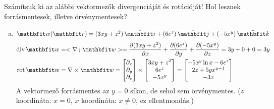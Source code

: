 \documentclass[exercise]{math-standalone}
\begin{document}
\begin{exercise}{%
    Számítsuk ki az alábbi vektormezők divergenciáját és rotációját!
    Hol lesznek forrásmentesek, illetve örvénymentesek?
  }
{\begin{enumerate}[a)]
      \item $\rvec w(\rvec r) = (3xy + z^2) \,\uvec i + (6 e^z) \,\uvec j + (-5x^y) \,\uvec k$
            \begin{align*}
              \Div \rvec w
               & = \scalar{\nabla}{\rvec w}
              = \pdv{(3xy + z^2)}{x} + \pdv{(6 e^z)}{y} + \pdv{(-5x^y)}{z}
              = 3y + 0 + 0
              = 3y
              \\
              \rot \rvec w
               & = \nabla \times \rvec w
              = \begin{bmatrix}
                  \partial_x \\ \partial_y \\ \partial_z
                \end{bmatrix} \times \begin{bmatrix}
                                       3xy + z^2 \\ 6e^z \\ -5x^y
                                     \end{bmatrix} = \begin{bmatrix}
                                                       -5 x^y \ln x - 6 e^z \\
                                                       2z + 5 y x^{y-1}     \\
                                                       -3x
                                                     \end{bmatrix}
            \end{align*}
            A vektormező forrásmentes az $y = 0$ síkon, de sehol sem
            örvénymentes. ($z$ koordináta: $x = 0$, $x$ koordináta: $x \neq 0$,
            ez ellentmondás.)
    \end{enumerate}
  }
\end{exercise}
\end{document}
